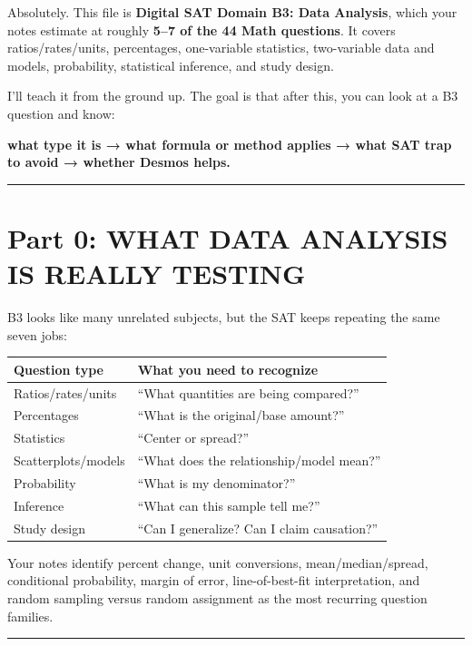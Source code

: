 \documentclass[
]{article}
\author{}
\date{}
\newcounter{none} %
\begin{document}
Absolutely. This file is \textbf{Digital SAT Domain B3: Data Analysis},
which your notes estimate at roughly \textbf{5--7 of the 44 Math
questions}. It covers ratios/rates/units, percentages, one-variable
statistics, two-variable data and models, probability, statistical
inference, and study design.

I'll teach it from the ground up. The goal is that after this, you can
look at a B3 question and know:

\textbf{what type it is → what formula or method applies → what SAT trap
to avoid → whether Desmos helps.}

\begin{center}\rule{0.5\linewidth}{0.5pt}\end{center}

\section{Part 0: WHAT DATA ANALYSIS IS REALLY
TESTING}\label{part-0-what-data-analysis-is-really-testing}

B3 looks like many unrelated subjects, but the SAT keeps repeating the
same seven jobs:

{\def\LTcaptype{none} %
\begin{longtable}[]{@{}ll@{}}
\toprule\noalign{}
Question type & What you need to recognize \\
\midrule\noalign{}
\endhead
\bottomrule\noalign{}
\endlastfoot
Ratios/rates/units & ``What quantities are being compared?'' \\
Percentages & ``What is the original/base amount?'' \\
Statistics & ``Center or spread?'' \\
Scatterplots/models & ``What does the relationship/model mean?'' \\
Probability & ``What is my denominator?'' \\
Inference & ``What can this sample tell me?'' \\
Study design & ``Can I generalize? Can I claim causation?'' \\
\end{longtable}
}

Your notes identify percent change, unit conversions,
mean/median/spread, conditional probability, margin of error,
line-of-best-fit interpretation, and random sampling versus random
assignment as the most recurring question families.

\begin{center}\rule{0.5\linewidth}{0.5pt}\end{center}
\end{document}

